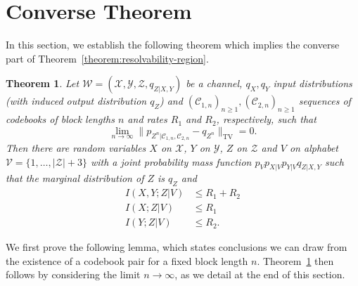 \documentclass[journal]{IEEEtran}
\newcommand{\channelpmf}{q}
\newcommand{\codebookpmf}{p}
\newcommand{\codebookRateOne}{R_1}
\newcommand{\codebookRateTwo}{R_2}
\newcommand{\channelInOne}{X}
\newcommand{\channelInOneAlph}{\mathcal{X}}
\newcommand{\channelInTwo}{Y}
\newcommand{\channelInTwoAlph}{\mathcal{Y}}
\newcommand{\channelOut}{Z}
\newcommand{\channelOutAlph}{\mathcal{Z}}
\newcommand{\channel}{\mathcal{W}}
\newcommand{\codebook}{\mathcal{C}}
\newcommand{\codebookBlocklength}{n}
\newcommand{\mutualInformationConditional}[3]{I(#1;#2|#3)}
\newcommand{\totalvariation}[1]{\lVert #1 \rVert_\mathrm{TV}}
\newcommand{\cardinality}[1]{\lvert #1 \rvert}
\newcommand{\timeSharingRV}{V}
\newcommand{\timeSharingAlph}{\mathcal{V}}
\newtheorem{theorem}{Theorem}
\begin{document}
\section{Converse Theorem}
\label{sec:converse}

In this section, we establish the following theorem which implies the converse part of Theorem~\ref{theorem:resolvability-region}.
\begin{theorem}
\label{converse-theorem}
Let $\channel = (\channelInOneAlph, \channelInTwoAlph, \channelOutAlph, \channelpmf_{\channelOut | \channelInOne, \channelInTwo})$ be a channel, $\channelpmf_\channelInOne, \channelpmf_\channelInTwo$ input distributions (with induced output distribution $\channelpmf_\channelOut$) and $(\codebook_{1,\codebookBlocklength})_{\codebookBlocklength \geq 1}, (\codebook_{2,\codebookBlocklength})_{\codebookBlocklength \geq 1}$ sequences of codebooks of block lengths $\codebookBlocklength$ and rates $\codebookRateOne$ and $\codebookRateTwo$, respectively, such that
\[
\lim\limits_{\codebookBlocklength \rightarrow \infty}
\totalvariation{\codebookpmf_{\channelOut^\codebookBlocklength | \codebook_{1,\codebookBlocklength}, \codebook_{2,\codebookBlocklength}} - \channelpmf_{\channelOut^\codebookBlocklength}}
=
0.
\]
Then there are random variables $\channelInOne$ on $\channelInOneAlph$, $\channelInTwo$ on $\channelInTwoAlph$, $\channelOut$ on $\channelOutAlph$ and $\timeSharingRV$ on alphabet $\timeSharingAlph=\{1, \dots, \cardinality{\channelOutAlph} + 3\}$ with a joint probability mass function $\codebookpmf_\timeSharingRV \codebookpmf_{\channelInOne | \timeSharingRV} \codebookpmf_{\channelInTwo | \timeSharingRV} \channelpmf_{\channelOut | \channelInOne, \channelInTwo}$ such that the marginal distribution of $\channelOut$ is $\channelpmf_\channelOut$ and
\begin{align}
\label{converse-theorem-sumrate}
\mutualInformationConditional{\channelInOne, \channelInTwo}{\channelOut}{\timeSharingRV}
&\leq
\codebookRateOne + \codebookRateTwo
\\
\label{converse-theorem-rateone}
\mutualInformationConditional{\channelInOne}{\channelOut}{\timeSharingRV}
&\leq
\codebookRateOne
\\
\label{converse-theorem-ratetwo}
\mutualInformationConditional{\channelInTwo}{\channelOut}{\timeSharingRV}
&\leq
\codebookRateTwo.
\end{align}
\end{theorem}

We first prove the following lemma, which states conclusions we can draw from the existence of a codebook pair for a fixed block length $\codebookBlocklength$. Theorem~\ref{converse-theorem} then follows by considering the limit $\codebookBlocklength \rightarrow \infty$, as we detail at the end of this section.
\end{document}
